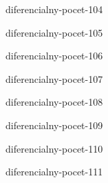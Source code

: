 \begin{defproblem}{diferencialny-pocet-104}

\end{defproblem}

\begin{defproblem}{diferencialny-pocet-105}

\end{defproblem}

\begin{defproblem}{diferencialny-pocet-106}

\end{defproblem}

\begin{defproblem}{diferencialny-pocet-107}

\end{defproblem}

\begin{defproblem}{diferencialny-pocet-108}

\end{defproblem}

\begin{defproblem}{diferencialny-pocet-109}

\end{defproblem}

\begin{defproblem}{diferencialny-pocet-110}

\end{defproblem}

\begin{defproblem}{diferencialny-pocet-111}

\end{defproblem}
